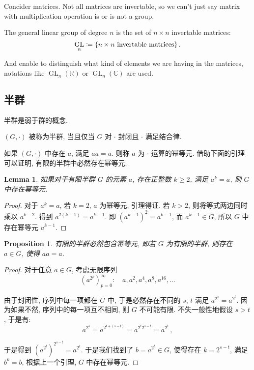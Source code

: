 \documentclass[UTF8]{ctexart}
\theoremstyle{mystyle}
\newtheorem{lemma}{Lemma}[section]
\newtheorem{proposition}{Proposition}[section]
\theoremstyle{myremark}
\theoremstyle{plain}
\newcommand{\R}{\mathbb R}
\newcommand{\C}{\mathbb C}
\DeclareMathOperator{\GL}{GL}
\DeclarePairedDelimiter\set{\{}{\}}
\begin{document}
Concider matrices. Not all matrices are invertable, so we can't just say matrix with multiplication operation is or is not a group.

\begin{definition}
    The general linear group of degree $ n $ is the set of $ n \times n $ invertable matrices:
    \[ \GL_n \coloneqq \set{n \times n \text{ invertable matrices}} \,.\]

    And enable to distinguish what kind of elements we are having in the matrices, notations like $ \GL_n(\R) $ or $ \GL_n(\C) $ are used.
\end{definition}

\subsection{半群}
半群是弱于群的概念.
\begin{definition}[\text{半群}]
    $ (G, \cdot) $ 被称为半群, 当且仅当 $ G $ 对 $ \cdot $ 封闭且 $ \cdot $ 满足结合律.
\end{definition}

如果 $ (G, \cdot) $ 中存在 $ a $, 满足 $ a a = a $. 则称 $ a $ 为 $ \cdot $ 运算的幂等元. 借助下面的引理可以证明, 有限的半群中必然存在幂等元.

\begin{lemma}
    如果对于有限半群 $ G $ 的元素 $ a $, 存在正整数 $ k \geqslant 2 $, 满足 $ a^k = a $, 则 $ G $ 中存在幂等元.
\end{lemma}

\begin{proof}
    对于 $ a^k = a $, 若 $ k = 2 $, $ a $ 为幂等元, 引理得证. 若 $ k > 2 $, 则将等式两边同时乘以 $ a^{k - 2} $. 得到 $ a^{2(k - 1)} = a^{k - 1} $. 即 $ \left( a^{k - 1} \right)^2 = a^{k - 1} $, 而 $ a^{k - 1} \in G $, 所以 $ G $ 中存在幂等元 $ a^{k - 1} $.
\end{proof}

\begin{proposition}
    有限的半群必然包含幂等元, 即若 $ G $ 为有限的半群, 则存在 $ a \in G $, 使得 $ aa = a $.
\end{proposition}

\begin{proof}
    对于任意 $ a \in G $, 考虑无限序列 \[ \left( a^{2^p} \right)_{p = 0}^\infty \colon \quad a, a^2, a^4, a^8, a^{16}, \dots \]

    由于封闭性, 序列中每一项都在 $ G $ 中, 于是必然存在不同的 $ s $, $ t $ 满足 $ a^{\displaystyle 2^s} = a^{\displaystyle 2^t} $. 因为如果不然, 序列中的每一项互不相同, 则 $ G $ 不可能有限. 不失一般性地假设 $ s > t $, 于是有: \[ a^{\displaystyle 2^{s}} = a^{\displaystyle 2^{t + (s - t)}} = a^{\displaystyle 2^{t} 2^{\displaystyle s - t}} = a^{\displaystyle 2^t} \,,\]

    于是得到 $ \left( a^{\displaystyle 2^t} \right)^{\displaystyle 2^{s - t}} = a^{\displaystyle 2^t} $. 于是我们找到了 $ b = a^{\displaystyle 2^t} \in G $, 使得存在 $ k = 2^{s - t} $, 满足 $ b^k = b $, 根据上一个引理, $ G $ 中存在幂等元.
\end{proof}
\end{document}
